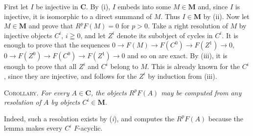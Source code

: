 First let $I$ be injective in $\mathbf C$. By (i), $I$ embeds into some
$M\in\mathbf M$ and, since $I$ is injective, it is isomorphic to a direct
summand of $M$. Thus $I\in\mathbf M$ by (ii). Now let $M\in\mathbf M$ and
prove that $R^pF(M)=0$ for $p>0$. Take a right resolution of $M$ by injective
objects $C^i$, $i\geqq0$, and let $Z^i$ denote its subobject of cycles in
$C^i$. It is enough to prove that the sequences
$0\to F(M)\to F(C^0)\to F(Z^1)\to0$,
$0\to F(Z^0)\to F(C^0)\to F(Z^1)\to0$ and so on
are exact. By (iii), it is enough to prove that all $Z^i$ and $C^i$ belong to
$M$. This is already known for the $C^i$, since they are injective,
and follows for the $Z^i$ by induction from (iii).

\indent\textsc{Corollary.} \textit{For every $A\in \mathbf C$, the objects $R^pF(A)$ may
be computed from any resolution of $A$ by objects $C^i\in\mathbf M$.}

Indeed, such a resolution exists by (\textit{i}), and computes the $R^pF(A)$ because
the lemma makes every $C^i$ $F$-acyclic.

